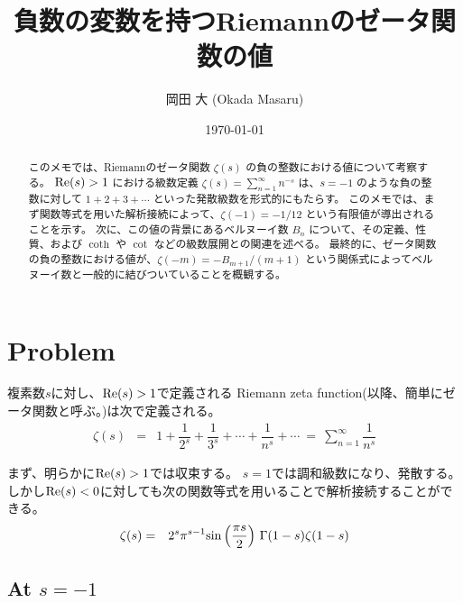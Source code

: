 \documentclass[uplatex,a4j,12pt,dvipdfmx]{jsarticle}
\title{負数の変数を持つRiemannのゼータ関数の値}
\author{岡田 大 (Okada Masaru)}
\date{\today}
\begin{document}
\allowdisplaybreaks
\maketitle

\begin{abstract}
	このメモでは、Riemannのゼータ関数 $\zeta(s)$ の負の整数における値について考察する。
	${\rm Re}(s) > 1$ における級数定義 $\zeta(s) = \sum_{n=1}^{\infty} n^{-s}$ は、$s=-1$ のような負の整数に対して $1+2+3+\cdots$ といった発散級数を形式的にもたらす。
	このメモでは、まず関数等式を用いた解析接続によって、$\zeta(-1) = -1/12$ という有限値が導出されることを示す。
	次に、この値の背景にあるベルヌーイ数 $B_n$ について、その定義、性質、および $\coth$ や $\cot$ などの級数展開との関連を述べる。
	最終的に、ゼータ関数の負の整数における値が、$\zeta(-m) = -B_{m+1}/(m+1)$ という関係式によってベルヌーイ数と一般的に結びついていることを概観する。
\end{abstract}

\tableofcontents

\section{Problem}

複素数$s$に対し、${\rm Re}(s) > 1$で定義される
Riemann zeta function(以降、簡単にゼータ関数と呼ぶ。)は次で定義される。
\begin{eqnarray}
	\zeta(s)
	&=&
	1
	+
	\dfrac{1}{2^{s}}
	+
	\dfrac{1}{3^{s}}
	+
	\cdots
	+
	\dfrac{1}{n^{s}}
	+
	\cdots
	\ = \
	\sum_{n=1}^{\infty}
	\dfrac{1}{n^{s}}
\end{eqnarray}

まず、明らかに${\rm Re}(s) >1$では収束する。
$s=1$では調和級数になり、発散する。
しかし${\rm Re}(s) < 0$に対しても次の関数等式を用いることで解析接続することができる。
\begin{eqnarray}
	\zeta(s)
	&=&
	2^{s}
	\pi^{s-1}
	{\rm sin}
	\left(
	\dfrac{\pi s}{2}
	\right)
	\ \!
	\Gamma(1-s)
	\zeta(1-s)
	\label{eqn:1302112125}
\end{eqnarray}

\subsection{At $s=-1$}
\end{document}
